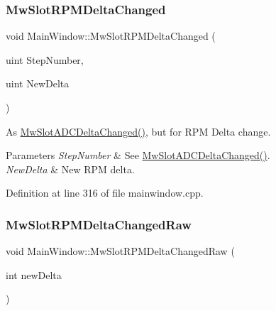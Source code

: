 \mbox{\label{class_main_window_a32b3a311b7151092db3ec0756d2c22d4}} 
\subsubsection{\texorpdfstring{Mw\+Slot\+R\+P\+M\+Delta\+Changed}{MwSlotRPMDeltaChanged}}
{\footnotesize\ttfamily void Main\+Window\+::\+Mw\+Slot\+R\+P\+M\+Delta\+Changed (\begin{DoxyParamCaption}\item[{uint}]{Step\+Number,  }\item[{uint}]{New\+Delta }\end{DoxyParamCaption})\hspace{0.3cm}{\ttfamily [slot]}}



As \hyperlink{class_main_window_a5778840f76f8ce6edd63d84b57b801b1}{Mw\+Slot\+A\+D\+C\+Delta\+Changed()}, but for R\+PM Delta change. 


\begin{DoxyParams}{Parameters}
{\em Step\+Number} & See \hyperlink{class_main_window_a5778840f76f8ce6edd63d84b57b801b1}{Mw\+Slot\+A\+D\+C\+Delta\+Changed()}. \\
\hline
{\em New\+Delta} & New R\+PM delta. \\
\hline
\end{DoxyParams}


Definition at line 316 of file mainwindow.\+cpp.

\mbox{\label{class_main_window_a4480e7516f91b93c8abc3d42c1284124}} 
\subsubsection{\texorpdfstring{Mw\+Slot\+R\+P\+M\+Delta\+Changed\+Raw}{MwSlotRPMDeltaChangedRaw}}
{\footnotesize\ttfamily void Main\+Window\+::\+Mw\+Slot\+R\+P\+M\+Delta\+Changed\+Raw (\begin{DoxyParamCaption}\item[{int}]{new\+Delta }\end{DoxyParamCaption})\hspace{0.3cm}{\ttfamily [slot]}}



